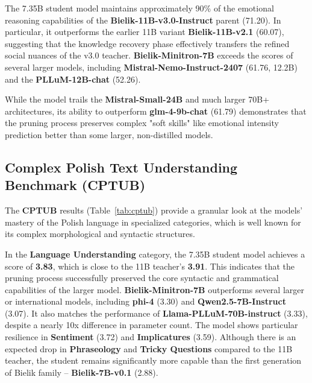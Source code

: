 \documentclass{article}
\begin{document}
The 7.35B student model maintains approximately 90\% of the emotional reasoning capabilities of the \textbf{Bielik-11B-v3.0-Instruct} parent (71.20). In particular, it outperforms the earlier 11B variant \textbf{Bielik-11B-v2.1} (60.07), suggesting that the knowledge recovery phase effectively transfers the refined social nuances of the v3.0 teacher. \textbf{Bielik-Minitron-7B} exceeds the scores of several larger models, including \textbf{Mistral-Nemo-Instruct-2407} (61.76, 12.2B) and the \textbf{PLLuM-12B-chat} (52.26).

While the model trails the \textbf{Mistral-Small-24B} and much larger 70B+ architectures, its ability to outperform \textbf{glm-4-9b-chat} (61.79) demonstrates that the pruning process preserves complex "soft skills" like emotional intensity prediction better than some larger, non-distilled models.

\subsection{Complex Polish Text Understanding Benchmark (CPTUB)}
The \textbf{CPTUB} results (Table~\ref{tab:cptub}) provide a granular look at the models' mastery of the Polish language in specialized categories, which is well known for its complex morphological and syntactic structures.

In the \textbf{Language Understanding} category, the 7.35B student model achieves a score of \textbf{3.83}, which is close to the 11B teacher's \textbf{3.91}. This indicates that the pruning process successfully preserved the core syntactic and grammatical capabilities of the larger model. \textbf{Bielik-Minitron-7B} outperforms several larger or international models, including \textbf{phi-4} (3.30) and \textbf{Qwen2.5-7B-Instruct} (3.07). It also matches the performance of \textbf{Llama-PLLuM-70B-instruct} (3.33), despite a nearly 10x difference in parameter count. The model shows particular resilience in \textbf{Sentiment} (3.72) and \textbf{Implicatures} (3.59). Although there is an expected drop in \textbf{Phraseology} and \textbf{Tricky Questions} compared to the 11B teacher, the student remains significantly more capable than the first generation of Bielik family -- \textbf{Bielik-7B-v0.1} (2.88).
\end{document}
